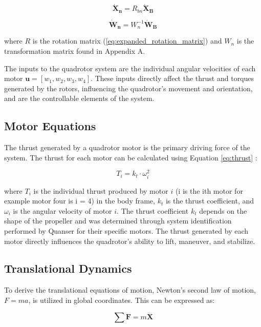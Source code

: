 \documentclass{UoNMCHA}
\numberwithin{equation}{section}
\begin{document}
\begin{equation}
\mathbf{\dot{X}_n} = R_{bn} \mathbf{\dot{X}_B}
\label{eq:velocity_transformation}
\end{equation}

\begin{equation}
\mathbf{\dot{W}_n} = W_n^{-1} \mathbf{\dot{W}_B}
\label{eq:angular_velocity_transformation}
\end{equation}
    

where \(R\) is the rotation matrix (\ref{eq:expanded_rotation_matrix}) and \(W_n\) is the transformation matrix found in Appendix A.

The inputs to the quadrotor system are the individual angular velocities of each motor \(\mathbf{u} = [w_1, w_2, w_3, w_4]\). These inputs directly affect the thrust and torques generated by the rotors, influencing the quadrotor's movement and orientation, and are the controllable elements of the system.

\subsection{Motor Equations}
The thrust generated by a quadrotor motor is the primary driving force of the system. The thrust for each motor can be calculated using Equation \ref{eq:thrust} \cite{HindawiDynamcis}:

\begin{equation}
T_i = k_t \cdot \omega_i^2
\label{eq:thrust}
\end{equation}

where \(T_i\) is the individual thrust produced by motor \(i\) (i is the ith motor for example motor four is i = 4) in the body frame, \(k_t\) is the thrust coefficient, and \(\omega_i\) is the angular velocity of motor \(i\). The thrust coefficient \(k_t\) depends on the shape of the propeller and was determined through system identification performed by Quanser for their specific motors. The thrust generated by each motor directly influences the quadrotor's ability to lift, maneuver, and stabilize.
\subsection{Translational Dynamics}
To derive the translational equations of motion, Newton's second law of motion, \( F = ma \), is utilized in global coordinates. This can be expressed as:

\begin{equation}
\sum \mathbf{F} = m \mathbf{\ddot{X}}
\label{eq:newton_law}
\end{equation}
\end{document}
